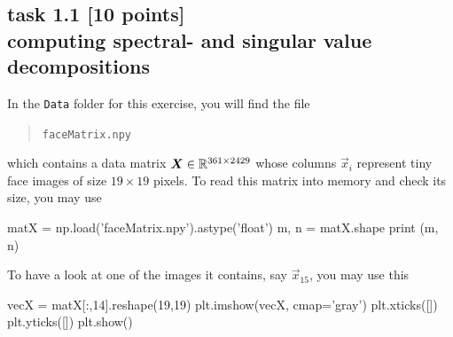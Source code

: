 
\subsection*{task 1.1 [10 points] \\[1ex] computing spectral- and singular value decompositions}

In the \texttt{Data} folder for this exercise, you will find the file
\begin{quote}
    \texttt{faceMatrix.npy}
\end{quote}
which contains a data matrix $\bm{X} \in \mathbb{R}^{361 \times 2429}$ whose columns $\vec{x}_i$ represent tiny face images of size $19 \times 19$ pixels. To read this matrix into memory and check its size, you may use
\begin{python}
matX = np.load('faceMatrix.npy').astype('float')
m, n = matX.shape
print (m, n)
\end{python}
To have a look at one of the images it contains, say $\vec{x}_{15}$, you may use this
\begin{python}
vecX = matX[:,14].reshape(19,19)
plt.imshow(vecX, cmap='gray')
plt.xticks([])
plt.yticks([])
plt.show()
\end{python}
\vspace{2cm}





